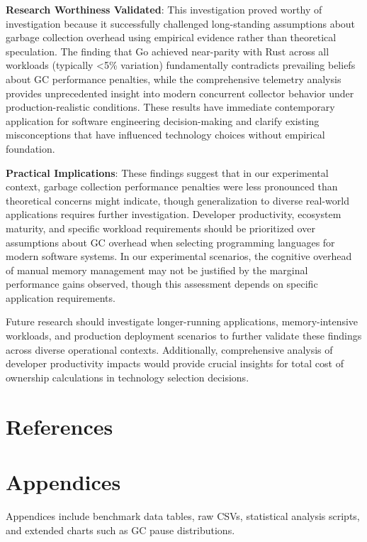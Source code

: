 \documentclass{article}
\begin{document}
\textbf{Research Worthiness Validated}: This investigation proved worthy of investigation because it successfully challenged long-standing assumptions about garbage collection overhead using empirical evidence rather than theoretical speculation. The finding that Go achieved near-parity with Rust across all workloads (typically <5\% variation) fundamentally contradicts prevailing beliefs about GC performance penalties, while the comprehensive telemetry analysis provides unprecedented insight into modern concurrent collector behavior under production-realistic conditions. These results have immediate contemporary application for software engineering decision-making and clarify existing misconceptions that have influenced technology choices without empirical foundation.

\textbf{Practical Implications}: These findings suggest that in our experimental context, garbage collection performance penalties were less pronounced than theoretical concerns might indicate, though generalization to diverse real-world applications requires further investigation. Developer productivity, ecosystem maturity, and specific workload requirements should be prioritized over assumptions about GC overhead when selecting programming languages for modern software systems. In our experimental scenarios, the cognitive overhead of manual memory management may not be justified by the marginal performance gains observed, though this assessment depends on specific application requirements.

Future research should investigate longer-running applications, memory-intensive workloads, and production deployment scenarios to further validate these findings across diverse operational contexts. Additionally, comprehensive analysis of developer productivity impacts would provide crucial insights for total cost of ownership calculations in technology selection decisions.

\section{References}



\section{Appendices}
Appendices include benchmark data tables, raw CSVs, statistical analysis scripts, and extended charts such as GC pause distributions.
\end{document}
